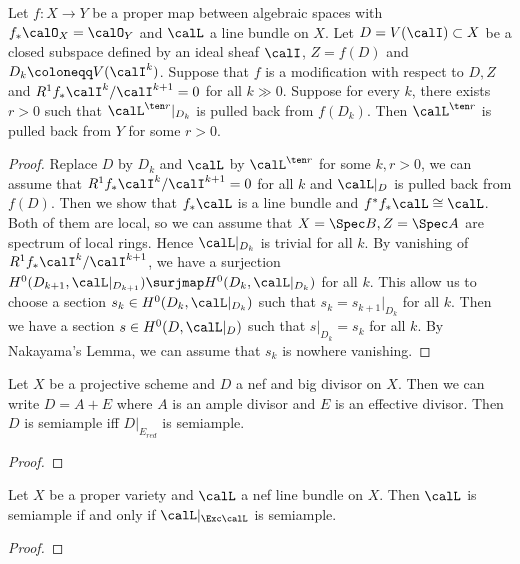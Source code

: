     \begin{lemma}
        Let \(f:X \to Y\) be a proper map between algebraic spaces with \(f_*\calO_X = \calO_Y\) and \(\calL\) a line bundle on \(X\).
        Let \(D = V(\calI) \subset X\) be a closed subspace defined by an ideal sheaf \(\calI\), \(Z = f(D)\) and \(D_k \coloneqq V(\calI^k)\).
        Suppose that \(f\) is a modification with respect to \(D,Z\) and \(R^1f_*\calI^k/\calI^{k+1} = 0\) for all \(k \gg 0\).
        Suppose for every \(k\), there exists \(r>0\) such that \(\calL^{\ten r}|_{D_k}\) is pulled back from \(f(D_k)\).
        Then \(\calL^{\ten r}\) is pulled back from \(Y\) for some \(r>0\).
    \end{lemma}
    \begin{proof}
        Replace \(D\) by \(D_k\) and \(\calL\) by \(\calL^{\ten r}\) for some \(k,r>0\), we can assume that \(R^1f_*\calI^k/\calI^{k+1} = 0\) for all \(k\) and \(\calL|_D\) is pulled back from \(f(D)\).
        Then we show that \(f_*\calL\) is a line bundle and \(f^*f_*\calL \cong \calL\).
        Both of them are local, so we can assume that \(X = \Spec B,Z=\Spec A\) are spectrum of local rings.
        Hence \(\calL|_{D_k}\) is trivial for all \(k\).
        By vanishing of \(R^1f_*\calI^k/\calI^{k+1}\), we have a surjection \(H^0(D_{k+1}, \calL|_{D_{k+1}}) \surjmap H^0(D_k, \calL|_{D_k})\) for all \(k\).
        This allow us to choose a section \(s_k \in H^0(D_k, \calL|_{D_k})\) such that \(s_k = s_{k+1}|_{D_k}\) for all \(k\).
        Then we have a section \(s \in H^0(D, \calL|_D)\) such that \(s|_{D_k} = s_k\) for all \(k\).
        By Nakayama's Lemma, we can assume that \(s_k\) is nowhere vanishing.
    \end{proof}

    \begin{proposition}\label{prop:semiample_nef_big_iff_effective_locus_char_p}
        Let \(X\) be a projective scheme and \(D\) a nef and big divisor on \(X\).
        Then we can write \(D = A + E\) where \(A\) is an ample divisor and \(E\) is an effective divisor.
        Then \(D\) is semiample iff \(D|_{E_{red}}\) is semiample.
    \end{proposition}
    \begin{proof}
    \end{proof}

    \begin{theorem}\label{thm:semiample_iff_semiample_on_exceptional_locus}
        Let \(X\) be a proper variety and \(\calL\) a nef line bundle on \(X\).
        Then \(\calL\) is semiample if and only if \(\calL|_{\Exc \calL}\) is semiample.
    \end{theorem}
    \begin{proof}
    \end{proof}


